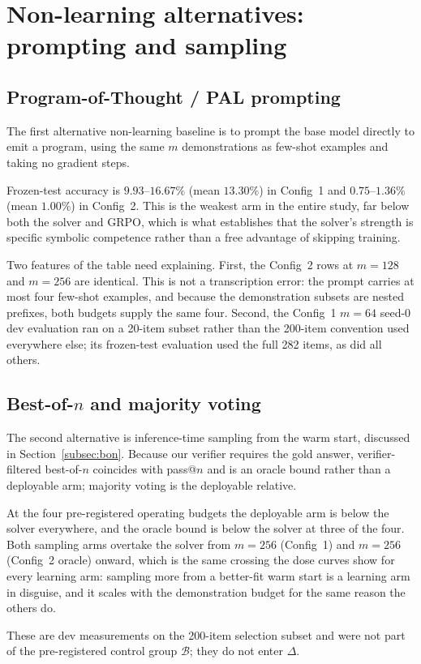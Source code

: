 \section{Non-learning alternatives: prompting and sampling}
\label{app:pot}

\subsection{Program-of-Thought / PAL prompting}

The first alternative non-learning baseline is to prompt the base model
directly to emit a program, using the same $m$ demonstrations as few-shot
examples and taking no gradient steps.



\noindent
Frozen-test accuracy is $9.93$--$16.67\%$ (mean $13.30\%$) in Config~1 and
$0.75$--$1.36\%$ (mean $1.00\%$) in Config~2. This is the weakest arm in the
entire study, far below both the solver and GRPO, which is what establishes
that the solver's strength is specific symbolic competence rather than a free
advantage of skipping training.

Two features of the table need explaining. First, the Config~2 rows at
$m{=}128$ and $m{=}256$ are identical. This is not a transcription error: the
prompt carries at most four few-shot examples, and because the demonstration
subsets are nested prefixes, both budgets supply the same four. Second, the
Config~1 $m{=}64$ seed-0 dev evaluation ran on a 20-item subset rather than the
200-item convention used everywhere else; its frozen-test evaluation used the
full 282 items, as did all others.

\subsection{Best-of-$n$ and majority voting}

The second alternative is inference-time sampling from the warm start, discussed
in Section~\ref{subsec:bon}. Because our verifier requires the gold answer,
verifier-filtered best-of-$n$ coincides with pass@$n$ and is an oracle bound
rather than a deployable arm; majority voting is the deployable relative.



\noindent
At the four pre-registered operating budgets the deployable arm is below the
solver everywhere, and the oracle bound is below the solver at three of the
four. Both sampling arms overtake the solver from $m{=}256$ (Config~1) and
$m{=}256$ (Config~2 oracle) onward, which is the same crossing the dose curves
show for every learning arm: sampling more from a better-fit warm start is a
learning arm in disguise, and it scales with the demonstration budget for the
same reason the others do.

These are dev measurements on the 200-item selection subset and were not part of
the pre-registered control group $\mathcal{B}$; they do not enter $\Delta$.
